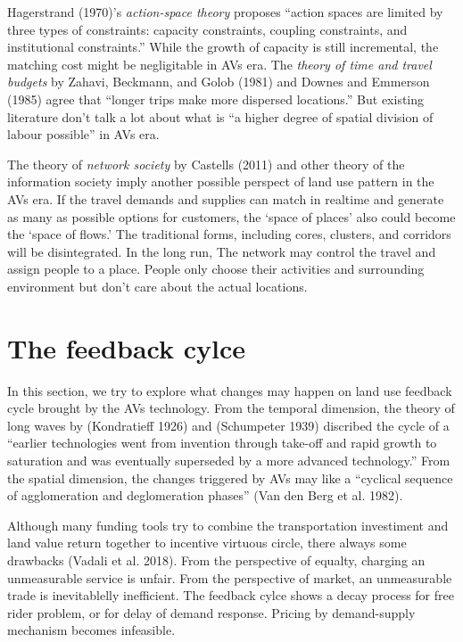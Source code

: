 \documentclass[12pt,]{article}
\begin{document}
Hagerstrand (1970)'s \emph{action-space theory} proposes ``action spaces
are limited by three types of constraints: capacity constraints,
coupling constraints, and institutional constraints.'' While the growth
of capacity is still incremental, the matching cost might be
negligitable in AVs era. The \emph{theory of time and travel budgets} by
Zahavi, Beckmann, and Golob (1981) and Downes and Emmerson (1985) agree
that ``longer trips make more dispersed locations.'' But existing
literature don't talk a lot about what is ``a higher degree of spatial
division of labour possible'' in AVs era.

The theory of \emph{network society} by Castells (2011) and other theory
of the information society imply another possible perspect of land use
pattern in the AVs era. If the travel demands and supplies can match in
realtime and generate as many as possible options for customers, the
`space of places' also could become the `space of flows.' The
traditional forms, including cores, clusters, and corridors will be
disintegrated. In the long run, The network may control the travel and
assign people to a place. People only choose their activities and
surrounding environment but don't care about the actual locations.

\hypertarget{the-feedback-cylce}{%
\section{The feedback cylce}\label{the-feedback-cylce}}

In this section, we try to explore what changes may happen on land use
feedback cycle brought by the AVs technology. From the temporal
dimension, the theory of long waves by (Kondratieff 1926) and
(Schumpeter 1939) discribed the cycle of a ``earlier technologies went
from invention through take-off and rapid growth to saturation and was
eventually superseded by a more advanced technology.'' From the spatial
dimension, the changes triggered by AVs may like a ``cyclical sequence
of agglomeration and deglomeration phases'' (Van den Berg et al. 1982).

Although many funding tools try to combine the transportation
investiment and land value return together to incentive virtuous circle,
there always some drawbacks (Vadali et al. 2018). From the perspective
of equalty, charging an unmeasurable service is unfair. From the
perspective of market, an unmeasurable trade is inevitablelly
inefficient. The feedback cylce shows a decay process for free rider
problem, or for delay of demand response. Pricing by demand-supply
mechanism becomes infeasible.
\end{document}
